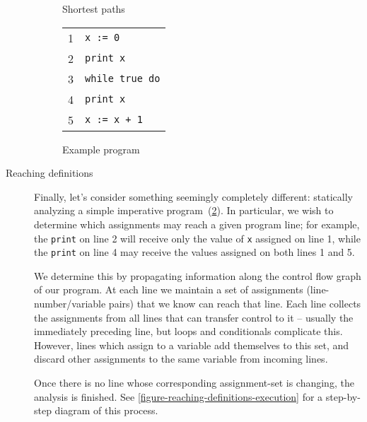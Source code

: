 \begin{description}
\begin{figure}[pth]
  \centering
  \caption{Shortest paths}
  \label{figure-shortest-paths}
\end{figure}


\begin{figure}[pth]
  \centering
  \ttfamily
  \begin{tabular}{cl}
    1 & \tt x := 0\\
    2 & \tt print x\\
    3 & \tt while true do\\
    4 & \tt\quad print x\\
    5 & \tt\quad x := x + 1
  \end{tabular}
  \caption{Example program}
  \label{figure-reaching-definitions}
\end{figure}

\item[Reaching definitions]
%
Finally, let's consider something seemingly completely different: statically
analyzing a simple imperative program~(\cref{figure-reaching-definitions}).
%
%
In particular, we wish to determine which assignments may reach a given program
line; for example, the \texttt{print} on line 2 will receive only the value of
\texttt{x} assigned on line 1, while the \texttt{print} on line 4 may receive
the values assigned on both lines 1 and 5.

We determine this by propagating information along the control flow graph of our
program.
%
At each line we maintain a set of assignments (line-number/variable pairs) that
we know can reach that line.
%
Each line collects the assignments from all lines that can transfer control to
it -- usually the immediately preceding line, but loops and conditionals
complicate this.
%
However, lines which assign to a variable add themselves to this set, and discard other assignments to the same variable from incoming lines.

Once there is no line whose corresponding assignment-set is changing, the analysis is finished.
%
See \cref{figure-reaching-definitions-execution} for a step-by-step diagram of this process. 



\end{description}

